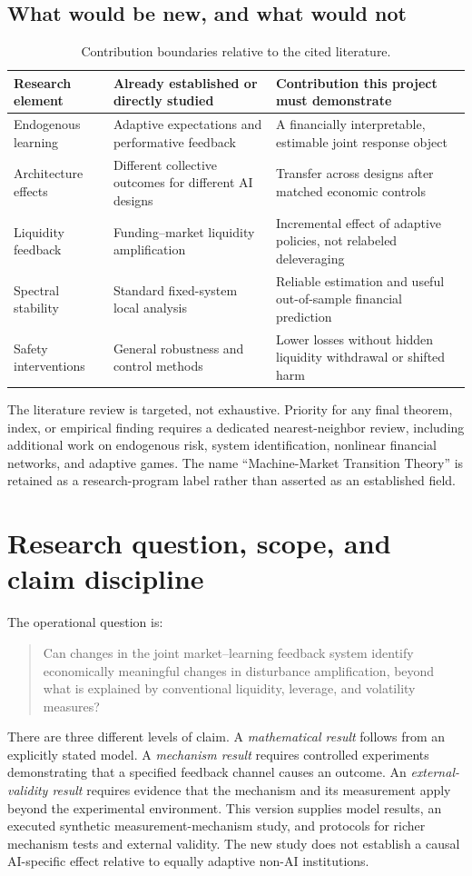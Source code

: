 \documentclass[11pt,a4paper]{article}
\theoremstyle{definition}
\theoremstyle{remark}
\begin{document}
\subsection{What would be new, and what would not}
\begin{table}[htbp]
\centering\small
\caption{Contribution boundaries relative to the cited literature.}
\label{tab:novelty}
\begin{tabularx}{\textwidth}{p{}YY}
\toprule
Research element & Already established or directly studied & Contribution this project must demonstrate \\
\midrule
Endogenous learning & Adaptive expectations and performative feedback & A financially interpretable, estimable joint response object \\
Architecture effects & Different collective outcomes for different AI designs & Transfer across designs after matched economic controls \\
Liquidity feedback & Funding--market liquidity amplification & Incremental effect of adaptive policies, not relabeled deleveraging \\
Spectral stability & Standard fixed-system local analysis & Reliable estimation and useful out-of-sample financial prediction \\
Safety interventions & General robustness and control methods & Lower losses without hidden liquidity withdrawal or shifted harm \\
\bottomrule
\end{tabularx}
\end{table}
The literature review is targeted, not exhaustive. Priority for any final theorem, index, or empirical finding requires a dedicated nearest-neighbor review, including additional work on endogenous risk, system identification, nonlinear financial networks, and adaptive games. The name ``Machine-Market Transition Theory'' is retained as a research-program label rather than asserted as an established field.

\section{Research question, scope, and claim discipline}
\label{sec:scope}
The operational question is:
\begin{quote}
Can changes in the joint market--learning feedback system identify economically meaningful changes in disturbance amplification, beyond what is explained by conventional liquidity, leverage, and volatility measures?
\end{quote}
There are three different levels of claim. A \emph{mathematical result} follows from an explicitly stated model. A \emph{mechanism result} requires controlled experiments demonstrating that a specified feedback channel causes an outcome. An \emph{external-validity result} requires evidence that the mechanism and its measurement apply beyond the experimental environment. This version supplies model results, an executed synthetic measurement-mechanism study, and protocols for richer mechanism tests and external validity. The new study does not establish a causal AI-specific effect relative to equally adaptive non-AI institutions.
\end{document}
